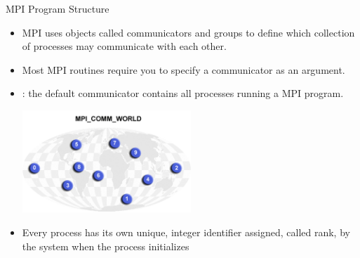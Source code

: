 \documentclass[9pt,c]{beamer}
\begin{document}
\begin{frame}{MPI Program Structure}
\begin{itemize}
\begin{center}
\begin{tabular}{|f|a|}
          \hline
        \end{tabular}
      \end{center}
  \framebreak
  \item MPI uses objects called communicators and groups to define which collection of processes may communicate with each other.
  \item Most MPI routines require you to specify a communicator as an argument.
  \item {}: the default communicator contains all processes running a MPI program.
    \begin{center}
      \includegraphics[width=0.5\textwidth]{./comm_world}      
    \end{center}
  \item Every process has its own unique, integer identifier assigned, called rank, by the system when the process initializes
  \end{itemize}
\end{frame}
\end{document}
